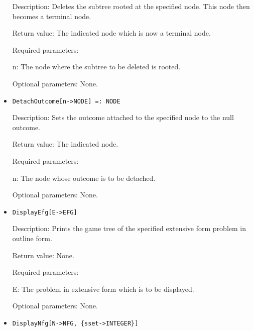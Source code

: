 \begin{itemize}
\bd
\item
[Description:] Deletes the subtree rooted at the specified node.  This
node then becomes a terminal node.
\item
[Return value:] The indicated node which is now a terminal node.
\item
[Required parameters:]\hfil\null

\bd
\item  
[n:] The node where the subtree to be deleted is rooted.
\ed

\item
[Optional parameters:] None.
\ed

\item
\protect \large \begin{verbatim}
DetachOutcome[n->NODE] =: NODE
\end{verbatim}\normalsize

\bd
\item
[Description:] Sets the outcome attached to the specified node to the
null outcome.
\item   
[Return value:] The indicated node.
\item
[Required parameters:]\hfil\null

\bd
\item	
[n:] The node whose outcome is to be detached.
\ed

\item
[Optional parameters:] None.
\ed

\item
\protect \large \begin{verbatim}
DisplayEfg[E->EFG]
\end{verbatim}\normalsize

\bd
\item
[Description:] Prints the game tree of the specified extensive form
problem in outline form.
\item
[Return value:] None.
\item
[Required parameters:]\hfil\null

\bd
\item
[E:] The problem in extensive form which is to be displayed.
\ed

\item
[Optional parameters:] None.
\ed

\item
\protect \large \begin{verbatim}
DisplayNfg[N->NFG, {sset->INTEGER}]
\end{verbatim}\normalsize


\end{itemize}
